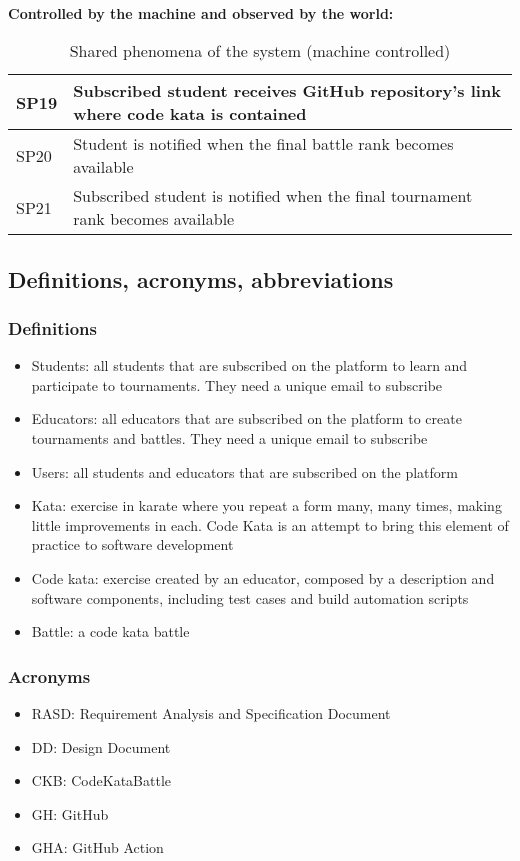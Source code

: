 \\
\textbf{Controlled by the machine and observed by the world:}
\begin{table}[h]
    \centering
    \begin{tabular}{|l|l|}
    \hline
        SP19 & Subscribed student receives GitHub repository's link where code kata is contained \\
    \hline
        SP20 & Student is notified when the final battle rank becomes available \\
    \hline
        SP21 & Subscribed student is notified when the final tournament rank becomes available \\
    \hline
    \end{tabular}
    \caption{Shared phenomena of the system (machine controlled)}
    \label{tab:goals}
\end{table}

\subsection{Definitions, acronyms, abbreviations}
\subsubsection{Definitions}
\begin{itemize}
    \item Students: all students that are subscribed on the platform to learn and participate to tournaments. They need a unique email to subscribe
    \item Educators: all educators that are subscribed on the platform to create tournaments and battles. They need a unique email to subscribe
    \item Users: all students and educators that are subscribed on the platform
    \item Kata: exercise in karate where you repeat a form many, many times, making little improvements in each. Code Kata is an attempt to bring this element of practice to software development
    \item Code kata: exercise created by an educator, composed by a description and software components, including test cases and build automation scripts
    \item Battle: a code kata battle
\end{itemize}

\subsubsection{Acronyms}
\begin{itemize}
    \item RASD: Requirement Analysis and Specification Document
    \item DD: Design Document
    \item CKB: CodeKataBattle
    \item GH: GitHub
    \item GHA: GitHub Action
\end{itemize}

